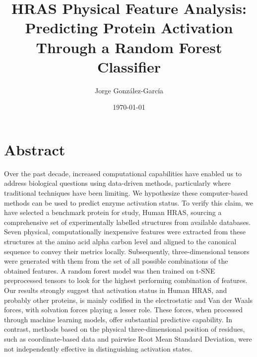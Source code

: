 \documentclass{article}
\title{HRAS Physical Feature Analysis: Predicting Protein Activation Through a Random Forest Classifier}
\author{Jorge González-García}
\date{\today}
\begin{document}
\maketitle

\section{Abstract}
Over the past decade, increased computational capabilities have enabled us to address biological questions using data-driven methods, particularly where traditional techniques have been limiting. We hypothesize these computer-based methods can be used to predict enzyme activation status. To verify this claim, we have selected a benchmark protein for study, Human HRAS, sourcing a comprehensive set of experimentally labelled structures from available databases. Seven physical, computationally inexpensive features were extracted from these structures at the amino acid alpha carbon level and aligned to the canonical sequence to convey their metrics locally. Subsequently, three-dimensional tensors were generated with them from the set of all possible combinations of the obtained features. A random forest model was then trained on t-SNE preprocessed tensors to look for the highest performing combination of features. Our results strongly suggest that activation status in Human HRAS, and probably other proteins, is mainly codified in the electrostatic and Van der Waals forces, with solvation forces playing a lesser role. These forces, when processed through machine learning models, offer substantial predictive capability. In contrast, methods based on the physical three-dimensional position of residues, such as coordinate-based data and pairwise Root Mean Standard Deviation, were not independently effective in distinguishing activation states.
\end{document}
